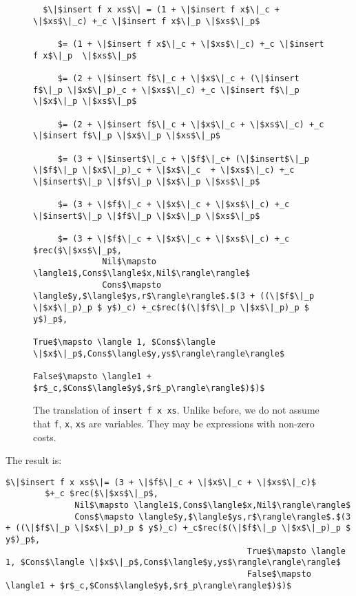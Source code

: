 \documentclass[12pt,letterpaper]{article}
\newcommand{\T}[1]{\texttt{#1}}
\begin{document}
\begin{figure}[H]
  \caption{The translation of \T{insert f x xs}.
  Unlike before, we do not assume that \T{f}, \T{x}, \T{xs} are variables.
  They may be expressions with non-zero costs.}
  \label{fig:insert_applied}
  \begin{lstlisting}
  $\|$insert f x xs$\| = (1 + \|$insert f x$\|_c + \|$xs$\|_c) +_c \|$insert f x$\|_p \|$xs$\|_p$

     $= (1 + \|$insert f x$\|_c + \|$xs$\|_c) +_c \|$insert f x$\|_p  \|$xs$\|_p$

     $= (2 + \|$insert f$\|_c + \|$x$\|_c + (\|$insert f$\|_p \|$x$\|_p)_c + \|$xs$\|_c) +_c \|$insert f$\|_p \|$x$\|_p \|$xs$\|_p$

     $= (2 + \|$insert f$\|_c + \|$x$\|_c + \|$xs$\|_c) +_c \|$insert f$\|_p \|$x$\|_p \|$xs$\|_p$

     $= (3 + \|$insert$\|_c + \|$f$\|_c+ (\|$insert$\|_p \|$f$\|_p \|$x$\|_p)_c + \|$x$\|_c  + \|$xs$\|_c) +_c \|$insert$\|_p \|$f$\|_p \|$x$\|_p \|$xs$\|_p$

     $= (3 + \|$f$\|_c + \|$x$\|_c + \|$xs$\|_c) +_c \|$insert$\|_p \|$f$\|_p \|$x$\|_p \|$xs$\|_p$

     $= (3 + \|$f$\|_c + \|$x$\|_c + \|$xs$\|_c) +_c $rec($\|$xs$\|_p$,
              Nil$\mapsto \langle1$,Cons$\langle$x,Nil$\rangle\rangle$
              Cons$\mapsto \langle$y,$\langle$ys,r$\rangle\rangle$.$(3 + ((\|$f$\|_p \|$x$\|_p)_p $ y$)_c) +_c$rec($(\|$f$\|_p \|$x$\|_p)_p $ y$)_p$,
                                                 True$\mapsto \langle 1, $Cons$\langle \|$x$\|_p$,Cons$\langle$y,ys$\rangle\rangle\rangle$
                                                 False$\mapsto \langle1 + $r$_c,$Cons$\langle$y$,$r$_p\rangle\rangle$)$)$
  \end{lstlisting}
\end{figure}


The result is:
\begin{lstlisting}
$\|$insert f x xs$\|= (3 + \|$f$\|_c + \|$x$\|_c + \|$xs$\|_c)$
        $+_c $rec($\|$xs$\|_p$,
              Nil$\mapsto \langle1$,Cons$\langle$x,Nil$\rangle\rangle$
              Cons$\mapsto \langle$y,$\langle$ys,r$\rangle\rangle$.$(3 + ((\|$f$\|_p \|$x$\|_p)_p $ y$)_c) +_c$rec($(\|$f$\|_p \|$x$\|_p)_p $ y$)_p$,
                                                 True$\mapsto \langle 1, $Cons$\langle \|$x$\|_p$,Cons$\langle$y,ys$\rangle\rangle\rangle$
                                                 False$\mapsto \langle1 + $r$_c,$Cons$\langle$y$,$r$_p\rangle\rangle$)$)$
\end{lstlisting}
\end{document}
